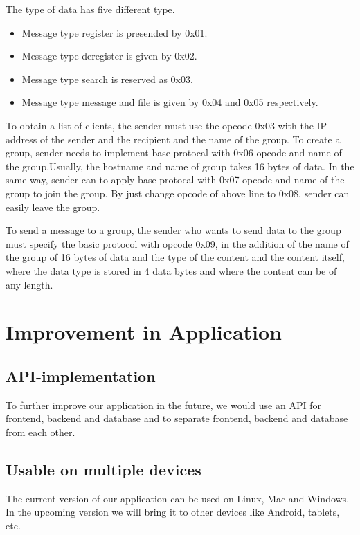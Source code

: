     The type of  data has five different type.
    \begin{itemize}
    	\item Message type register is presended by 0x01.
    	\item Message type deregister is given  by 0x02.
    	\item Message type search is reserved as 0x03.
    	\item Message type message and file is given by 0x04 and 0x05 respectively.
    \end{itemize}
	 \medskip
	
	\noindent
	To obtain a list of clients, the sender must use the opcode 0x03 with the IP address of the sender 
	and the recipient and the name of the group.
	To create a group, sender needs to implement base protocal with 0x06 opcode and name 
	of the group.Usually, the hostname and name of group takes 16 bytes of data.
	In the same way, sender can to apply  base protocal with 0x07 opcode and name 
	of the group to join the group.
	By just change opcode of above line to 0x08, sender can easily leave the group.
	
	To send a message to a group, the sender who wants to send data to the group must specify
	 the basic protocol  with opcode 0x09, in the addition of the name of the group of 16 bytes 
	 of data and the type of the content and the content itself, where the data type is stored 
	 in 4 data bytes and where the content can be of any length. 
    \medskip

    \noindent
    
    \section{Improvement in Application}\label{sec:improvement in application}

    \subsection{API-implementation}\label{subsec:api-implementation}
    To further improve our application in the future, we would use an API for frontend,
    backend and database and to separate frontend, backend and database from each other.
    
    \subsection{Usable on multiple devices} \label{subsec:usable-on-multiple-devices}
    The current version of our application can be used on Linux, Mac and Windows.
    In the upcoming version we will bring it to other devices like Android, tablets, etc.

